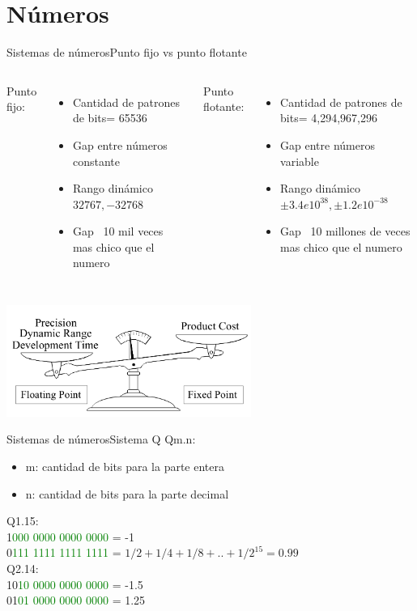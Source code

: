  \section{Números}
 \begin{frame}{Sistemas de números}{Punto fijo vs punto flotante}
    \begin{columns}[onlytextwidth]
    Punto fijo:
       \scriptsize{
    \begin{itemize}
       \item{Cantidad de patrones de bits= 65536}
       \item{Gap entre números constante }
       \item{Rango dinámico $32767, -32768$}
       \item{Gap ~10 mil veces mas chico que el numero}
    \end{itemize}
 }
    Punto flotante:
       \scriptsize{
    \begin{itemize}
       \item{Cantidad de patrones de bits= 4,294,967,296}
       \item{Gap entre números variable }
       \item{Rango dinámico $\pm3.4 e10^{38},  \pm1.2 e10^{-38}$}
       \item{Gap ~10 millones de veces mas chico que el numero}
    \end{itemize}
 }
    \end{columns}
       \center\includegraphics[width=8cm]{2_clase/fix_vs_float}
    \vfill
 \end{frame}
 \begin{frame}[t]{Sistemas de números}{Sistema Q}
       Qm.n:
       \begin{itemize}
          \item{m: cantidad de bits para la parte entera}
          \item{n: cantidad de bits para la parte decimal}
       \end{itemize}
       Q1.15: \\
          1\textcolor{green}{000 0000 0000 0000} =  -1 \\
          0\textcolor{green}{111 1111 1111 1111} = $1/2+1/4+1/8+..+1/2^{15} = 0.99$ \\
       Q2.14: \\
          10\textcolor{green}{10 0000 0000 0000} =  -1.5 \\
          01\textcolor{green}{01 0000 0000 0000} =  1.25
    \vfill
 \end{frame}
